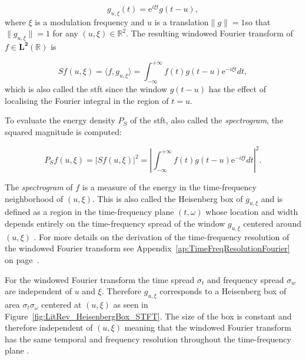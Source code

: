 \begin{equation}\label{eq:Mallat1999}
g_{u,\xi}(t) = \mathrm{e}^{i\xi t}g(t-u),
\end{equation}
where $\xi$ is a modulation frequency and $u$ is a translation\DIFdelbegin {}\DIFdelend \DIFaddbegin {}\DIFaddend $\|g\| = 1$\DIFaddbegin \DIFadd{, }\DIFaddend so that $\|g_{u,\xi}\| = 1$ for any $(u, \xi) \in \mathbb{R}^2$. The resulting windowed Fourier transform of $f \in \mathbf{L^2}(\mathbb{R})$ is

\begin{equation}\label{eq:Mallat1999_2}
S f(u, \xi) = \langle f, g_{u,\xi} \rangle = \int^{+\infty}_{-\infty}  f(t)g(t-u)\mathrm{e}^{-i\xi t} dt,
\end{equation}
which is also called the \DIFdelbegin {}\DIFdelend \DIFaddbegin \gls{stft} \DIFaddend since the window $g(t-u)$ has the effect of localising the Fourier integral in the region of $t=u$. \DIFaddbegin {}\DIFaddend

To evaluate the energy density $P_S$ of the \DIFdelbegin {}\DIFdelend \DIFaddbegin \gls{stft}\DIFaddend , also called the \emph{spectrogram}, the squared magnitude is computed:

\begin{equation}\label{eq:Mallat1999_3}
P_S f(u,\xi) = |S f(u,\xi)|^2 = \left| \int^{+\infty}_{-\infty} f(t)g(t-u)\mathrm{e}^{-i\xi t} dt \right|^2.
\end{equation}

The \emph{spectrogram} of $f$ is a measure of the energy in the time-frequency neighborhood of $(u,\xi)$. This is also called the Heisenberg box of $g_{u,\xi}$ and is defined as a region in the time-frequency plane $(t, \omega)$ whose location and width depends entirely on the time-frequency spread of the window $g_{u,\xi}$ centered around $(u,\xi)$ \cite{Mallat1999}. For more details on the derivation of the time-frequency resolution of the windowed Fourier transform see Appendix~\ref{ap:TimeFreqResolutionFourier} on page~\pageref{ap:TimeFreqResolutionFourier}.

For the windowed Fourier transform the time spread $\sigma_t$ and frequency spread $\sigma_w$ are independent of $u$ and $\xi$. Therefore $g_{u,\xi}$ corresponds to a Heisenberg box of area $\sigma_t \sigma_\omega$ centered at $(u,\xi)$ as seen in Figure~\ref{fig:LitRev_HeisenbergBox_STFT}\cite{Heisenberg1927}. The size of the box is constant and therefore independent of $(u,\xi)$ meaning that the windowed Fourier transform has the same temporal and frequency resolution throughout the time-frequency plane \cite{Mallat1999}.

